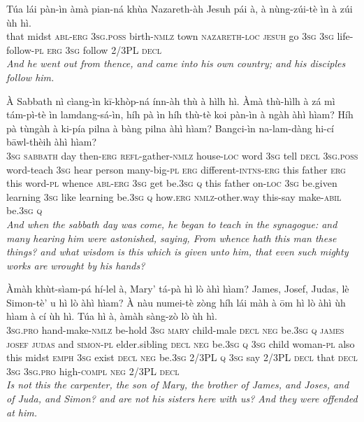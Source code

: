 \documentclass[11pt,a4paper]{article}
\begin{document}
\begin{exe}
\gll Túa lái pàn-ìn àmà pian-ná khùa Nazareth-àh Jesuh pái à, à nùng-zúi-tè ìn à zúi ùh hì. \\
     that midst \textsc{abl}-\textsc{erg} \textsc{3sg}.\textsc{poss} birth-\textsc{nmlz} town \textsc{nazareth}-\textsc{loc} \textsc{jesuh} go \textsc{3sg} \textsc{3sg} life-follow-\textsc{pl} \textsc{erg} \textsc{3sg} follow 2/3PL \textsc{decl} \\
\glt \textcolor{kjvcolor}{\textit{And he went out from thence, and came into his own country; and his disciples follow him.}}

\gll À Sabbath nì cìang-ìn kī-khòp-ná ínn-àh thù à hìlh hì. Àmà thù-hìlh à zá mì tám-pì-tè ìn lamdang-sá-ìn, híh pà ìn híh thù-tè koi pàn-ìn à ngàh àhì hìam? Híh pà tùngàh à ki-pía pilna à bàng pilna àhì hìam? Bangci-ìn na-lam-dàng hi-cí bāwl-thèih àhì hìam? \\
     \textsc{3sg} \textsc{sabbath} day then-\textsc{erg} \textsc{refl}-gather-\textsc{nmlz} house-\textsc{loc} word \textsc{3sg} tell \textsc{decl} \textsc{3sg}.\textsc{poss} word-teach \textsc{3sg} hear person many-big-\textsc{pl} \textsc{erg} different-\textsc{intns}-\textsc{erg} this father \textsc{erg} this word-\textsc{pl} whence \textsc{abl}-\textsc{erg} \textsc{3sg} get be.\textsc{3sg} \textsc{q} this father on-\textsc{loc} \textsc{3sg} be.given learning \textsc{3sg} like learning be.\textsc{3sg} \textsc{q} how.\textsc{erg} \textsc{nmlz}-other.way this-say make-\textsc{abil} be.\textsc{3sg} \textsc{q} \\
\glt \textcolor{kjvcolor}{\textit{And when the sabbath day was come, he began to teach in the synagogue: and many hearing him were astonished, saying, From whence hath this man these things? and what wisdom is this which is given unto him, that even such mighty works are wrought by his hands?}}

\gll Àmàh khùt-sìam-pá hí-lel à, Mary' tá-pà hì lò àhì hìam? James, Josef, Judas, lè Simon-tè' u hì lò àhì hìam? À nàu numei-tè zòng híh lái màh à ōm hì lò àhì ùh hìam à cí ùh hì. Túa hì à, àmàh sàng-zò lò ùh hì. \\
     \textsc{3sg}.\textsc{pro} hand-make-\textsc{nmlz} be-hold \textsc{3sg} \textsc{mary} child-male \textsc{decl} \textsc{neg} be.\textsc{3sg} \textsc{q} \textsc{james} \textsc{josef} \textsc{judas} and \textsc{simon}-\textsc{pl} elder.sibling \textsc{decl} \textsc{neg} be.\textsc{3sg} \textsc{q} \textsc{3sg} child woman-\textsc{pl} also this midst \textsc{emph} \textsc{3sg} exist \textsc{decl} \textsc{neg} be.\textsc{3sg} 2/3PL \textsc{q} \textsc{3sg} say 2/3PL \textsc{decl} that \textsc{decl} \textsc{3sg} \textsc{3sg}.\textsc{pro} high-\textsc{compl} \textsc{neg} 2/3PL \textsc{decl} \\
\glt \textcolor{kjvcolor}{\textit{Is not this the carpenter, the son of Mary, the brother of James, and Joses, and of Juda, and Simon? and are not his sisters here with us? And they were offended at him.}}


\end{exe}
\end{document}
